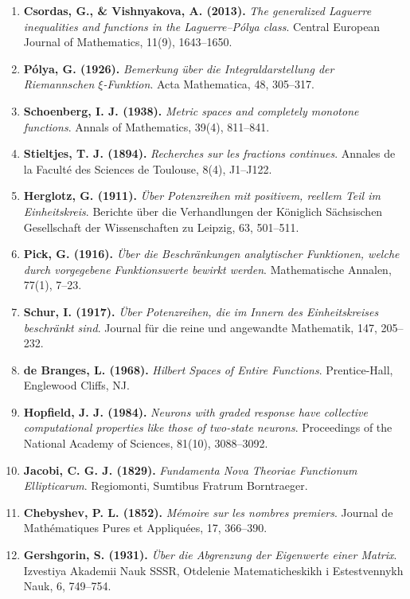 \documentclass[
  11pt,
]{article}
\begin{document}
\begin{enumerate}
{  hypothesis}. Periodica Mathematica Hungarica, 60(1), 37--40.
\item
  \textbf{Csordas, G., \& Vishnyakova, A. (2013).} \emph{The generalized
  Laguerre inequalities and functions in the Laguerre--Pólya class}.
  Central European Journal of Mathematics, 11(9), 1643--1650.
\item
  \textbf{Pólya, G. (1926).} \emph{Bemerkung über die
  Integraldarstellung der Riemannschen \(\xi\)-Funktion}. Acta
  Mathematica, 48, 305--317.
\item
  \textbf{Schoenberg, I. J. (1938).} \emph{Metric spaces and completely
  monotone functions}. Annals of Mathematics, 39(4), 811--841.
\item
  \textbf{Stieltjes, T. J. (1894).} \emph{Recherches sur les fractions
  continues}. Annales de la Faculté des Sciences de Toulouse, 8(4),
  J1--J122.
\item
  \textbf{Herglotz, G. (1911).} \emph{Über Potenzreihen mit positivem,
  reellem Teil im Einheitskreis}. Berichte über die Verhandlungen der
  Königlich Sächsischen Gesellschaft der Wissenschaften zu Leipzig, 63,
  501--511.
\item
  \textbf{Pick, G. (1916).} \emph{Über die Beschränkungen analytischer
  Funktionen, welche durch vorgegebene Funktionswerte bewirkt werden}.
  Mathematische Annalen, 77(1), 7--23.
\item
  \textbf{Schur, I. (1917).} \emph{Über Potenzreihen, die im Innern des
  Einheitskreises beschränkt sind}. Journal für die reine und angewandte
  Mathematik, 147, 205--232.
\item
  \textbf{de Branges, L. (1968).} \emph{Hilbert Spaces of Entire
  Functions}. Prentice-Hall, Englewood Cliffs, NJ.
\item
  \textbf{Hopfield, J. J. (1984).} \emph{Neurons with graded response
  have collective computational properties like those of two-state
  neurons}. Proceedings of the National Academy of Sciences, 81(10),
  3088--3092.
\item
  \textbf{Jacobi, C. G. J. (1829).} \emph{Fundamenta Nova Theoriae
  Functionum Ellipticarum}. Regiomonti, Sumtibus Fratrum Borntraeger.
\item
  \textbf{Chebyshev, P. L. (1852).} \emph{Mémoire sur les nombres
  premiers}. Journal de Mathématiques Pures et Appliquées, 17, 366--390.
\item
  \textbf{Gershgorin, S. (1931).} \emph{Über die Abgrenzung der
  Eigenwerte einer Matrix}. Izvestiya Akademii Nauk SSSR, Otdelenie
  Matematicheskikh i Estestvennykh Nauk, 6, 749--754.

\end{enumerate}
\end{document}
